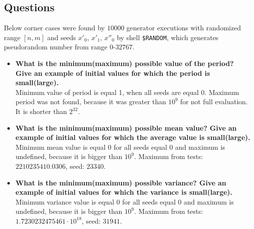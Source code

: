 \documentclass[a4paper,10pt]{article}
\begin{document}
\subsection{Questions}
Below corner cases were found by $10000$ generator executions with randomized range $[n,m]$ and seeds ${x'_0}$, ${x'_1}$, ${x''_0}$ by shell \texttt{\$RANDOM}, which generates pseudorandom number from range $0$-$32767$.
\begin{itemize}
 \item \textbf{What is the minimum(maximum) possible value of the period? Give an example of initial values for which the period is small(large).} \\ 
Minimum value of period is equal 1, when all seeds are equal 0. Maximum period was not found, because it was greater than $10^9$ for not full evaluation. It is shorter than $2^32$.
 \item \textbf{What is the minimum(maximum) possible mean value? Give an example of initial values for which the average value is small(large).} \\
Minimum mean value is equal 0 for all seeds equal 0 and maximum is undefined, because it is bigger than $10^9$. Maximum from tests: $2210235410.0306$, seed: $23340$.
 \item \textbf{What is the minimum(maximum) possible variance? Give an example of initial values for which the variance is small(large).} \\
Minimum variance value is equal 0 for all seeds equal 0 and maximum is undefined, because it is bigger than $10^9$. Maximum from tests: $1.7230232475461\cdot 10^{18}$, seed: $31941$.


\end{itemize}
\end{document}
